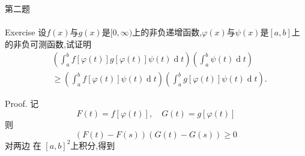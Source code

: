 \documentclass{beamer}
\begin{document}
\begin{frame}[fragile]{第二题}
\framesubtitle{}

\begin{block}{Exercise}
  设\(f(x)\)与\(g(x)\)是\([0,\infty)\)上的非负递增函数,\(\varphi(x)\)与\(\psi(x)\)是\([a,b]\)上的非负可测函数,试证明
\[
\begin{aligned}
&\left(\int_a^b f[\varphi(t)]g[\varphi(t)]\psi(t)\operatorname{d}t\right)
\left(\int_a^b \psi(t)\operatorname{d}t\right)\\ 
 &
\ge
\left(\int_a^b f[\varphi(t)]\psi(t)\operatorname{d}t\right)
\left(\int_a^b g[\varphi(t)]\psi(t)\operatorname{d}t\right). 
\end{aligned}
\]
\end{block}
Proof.    
    记 \[
  F\left( t \right)= f\left[  \varphi \left( t \right)  \right],\quad G\left( t \right)= g\left[  \varphi \left( t \right)  \right]    
  \]则 \[
  \left( F\left( t \right)-F\left( s \right)   \right)\left( G\left( t \right)-G\left( s \right)   \right)\ge 0  
  \]对两边 在 \(  \left[ a,b \right]^{2}   \)上积分,得到  
\end{frame}
\end{document}
